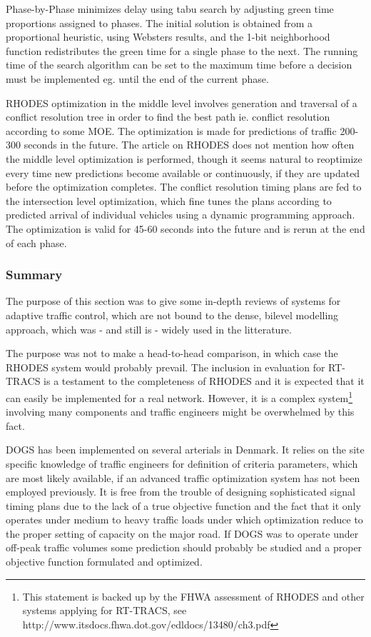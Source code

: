 Phase-by-Phase minimizes delay using tabu search by adjusting green time proportions assigned to phases. The initial solution is obtained from a proportional heuristic, using Websters results, and the 1-bit neighborhood function redistributes the green time for a single phase to the next. 
The running time of the search algorithm can be set to the maximum time before a decision must be implemented eg. until the end of the current phase.

RHODES optimization in the middle level involves generation and traversal of a conflict resolution tree in order to find the best path ie. conflict resolution according to some MOE. The optimization is made for predictions of traffic 200-300 seconds in the future. The article on RHODES does not mention how often the middle level optimization is performed, though it seems natural to reoptimize every time new predictions become available or continuously, if they are updated before the optimization completes.
The conflict resolution timing plans are fed to the intersection level optimization, which fine tunes the plans according to predicted arrival of individual vehicles using a dynamic programming approach. The optimization is valid for 45-60 seconds into the future and is rerun at the end of each phase.

\subsubsection*{Summary}
The purpose of this section was to give some in-depth reviews of systems for adaptive traffic control, which are not bound to the dense, bilevel modelling approach, which was - and still is - widely used in the litterature. 

The purpose was not to make a head-to-head comparison, in which case the RHODES system would probably prevail. The inclusion in evaluation for RT-TRACS is a testament to the completeness of RHODES and it is expected that it can easily be implemented for a real network. However, it is a complex system\footnote{This statement is backed up by the FHWA assessment of RHODES and other systems applying for RT-TRACS, see http://www.itsdocs.fhwa.dot.gov/edldocs/13480/ch3.pdf} involving many components and traffic engineers might be overwhelmed by this fact. 

DOGS has been implemented on several arterials in Denmark. It relies on the site specific knowledge of traffic engineers for definition of criteria parameters, which are most likely available, if an advanced traffic optimization system has not been employed previously. It is free from the trouble of designing sophisticated signal timing plans due to the lack of a true objective function and the fact that it only operates under medium to heavy traffic loads under which optimization reduce to the proper setting of capacity on the major road. If DOGS was to operate under off-peak traffic volumes some prediction should probably be studied and a proper objective function formulated and optimized.

